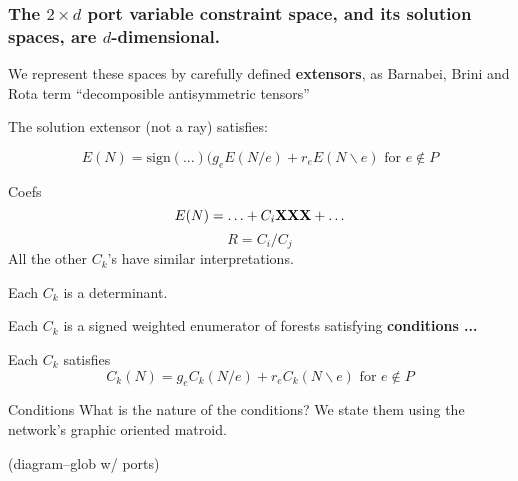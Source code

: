 \documentclass{beamer}
\begin{document}

\begin{frame}
\frametitle{The $2\times d$ port variable constraint space, 
and its solution spaces, are $d$-dimensional.}

We represent these spaces by carefully defined
\textbf{extensors}, as Barnabei, Brini and Rota \cite{exteriorCalc}
term ``decomposible antisymmetric tensors''

The solution extensor (not a ray) satisfies:

\[
E(N) = \text{sign}(...)(g_e E(N/e) + r_e E(N\backslash e)
\text{\ for\ }e\not\in P
\]

\end{frame}



\begin{frame}{Coefs}
\[
E(N) = \ldots + C_i\mbox{\bf XXX} + \ldots
\]
\[
R = C_i/C_j
\]
All the other $C_k$'s have similar interpretations.

Each $C_k$ is a determinant.

Each $C_k$ is a signed weighted enumerator of
forests satisfying \textbf{conditions ...}

Each $C_k$ satisfies
\[
C_k(N) = g_e C_k(N/e) + r_e C_k(N\backslash e)
\text{\ for\ }e\not\in {P}
\]

\end{frame}

\begin{frame}{Conditions}
What is the nature of the conditions?  We state them using the 
network's graphic oriented matroid.

(diagram--glob w/ ports)

\end{frame}





\end{document}
